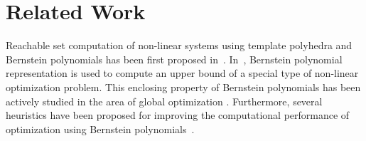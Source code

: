 


\section{Related Work}
\label{sec:related}

Reachable set computation of non-linear systems using template polyhedra and Bernstein polynomials has been first proposed in~\cite{dang2009image}.
%
In~\cite{dang2009image}, Bernstein polynomial representation is used to compute an upper bound of a special type of non-linear optimization problem.
%
This enclosing property of Bernstein polynomials has been actively studied in the area of global optimization \cite{nataray2002algorithm, garloff2003bernstein, nataraj2007new}.
%
Furthermore, several heuristics have been proposed for improving the computational performance of optimization using Bernstein polynomials~\cite{smith2009fast,munoz2013formalization}.

